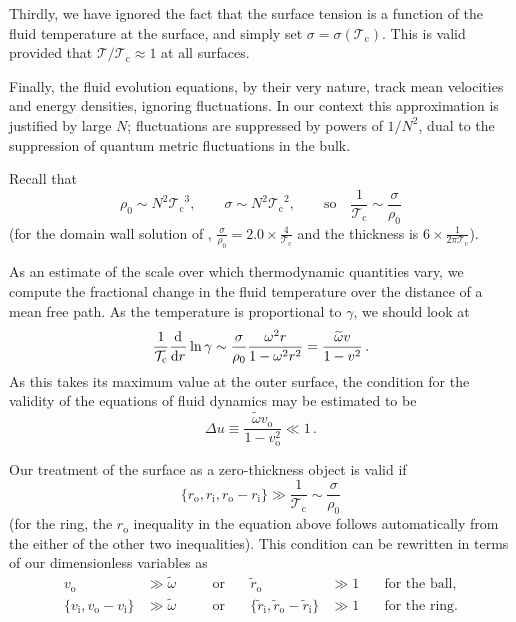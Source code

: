\documentclass[12pt,a4paper]{article}
\newcommand{\diff}[3][\rule{0mm}{0mm}]{\frac{\mathrm{d}^{#1} #2}{\mathrm{d}{#3}^{#1}}}
\newcommand{\rz}{\rho_0}
\newcommand{\tc}{\mathcal{T_\mathrm{c}}}
\newcommand{\tloc}{\mathcal{T}}
\newcommand{\ri}{r_\mathrm{i}}
\newcommand{\ro}{r_\mathrm{o}}
\newcommand{\vi}{v_\mathrm{i}}
\newcommand{\vo}{v_\mathrm{o}}
\newcommand{\z}{\tilde{r}}
\newcommand{\zi}{\z_\mathrm{i}}
\newcommand{\zo}{\z_\mathrm{o}}
\newcommand{\tw}{\widetilde{\omega}}
\begin{document}
Thirdly, we have ignored the fact that the surface tension is a
function of the fluid temperature at the surface, and simply set
$\sigma=\sigma(\tc)$. This is valid provided that $\tloc/\tc \approx
1$ at all surfaces.

Finally, the fluid evolution equations, by their very nature, track mean
velocities and energy densities, ignoring fluctuations. In our context this
approximation is justified by large $N$; fluctuations are suppressed by powers of $1/N^2$,
dual to the suppression of quantum metric fluctuations in the bulk.

Recall that
%
\begin{equation*}
  \rz \sim N^2\tc^3, \qquad \sigma \sim  N^2\tc^2,
  \qquad \text{so}\quad \frac{1}{\tc} \sim \frac{\sigma}{\rz}
\end{equation*}
%
(for the domain wall solution of \cite{Aharony:2005bm},
$\frac{\sigma}{\rz}=2.0\times \frac{4}{\tc}$ and the thickness is
$6\times \frac{1}{2\pi \tc}$).

As an estimate of the scale over which thermodynamic quantities
vary, we compute the fractional change in the fluid temperature over
the distance of a mean free path. As the temperature is proportional
to $\gamma$, we should look at
%
\begin{equation*}
  \frac{1}{\tc}\diff{}{r}\ln\gamma \sim
   \frac{\sigma}{\rz} \frac{\omega^2 r}{1-\omega^2r^2} =
   \frac{\tw v}{1-v^2}\,.
\end{equation*}
%
As this takes its maximum value at the outer surface, the condition
for the validity of the equations of fluid dynamics  may be
estimated to be
%
\begin{equation}\label{validity2:eq}
  \Delta u \equiv \frac{\tw \vo}{1-\vo^2} \ll 1\,.
\end{equation}
%

Our treatment of the surface as a zero-thickness object is valid if
%
\begin{equation*}
  \{\ro,\ri,\ro-\ri\} \gg \frac{1}{\tc} \sim
  \frac{\sigma}{\rz}
\end{equation*}
%
(for the ring, the $\ro$ inequality in the equation above follows
automatically from the either of the other two inequalities). This
condition can be rewritten in terms of our dimensionless variables
as
%
\begin{equation}\label{validity:eq}
\begin{aligned}
  \vo &\gg \tw
      &\quad&\text{or}\quad&
   \zo &\gg 1
      &\quad \text{for the ball,}\\
  \{\vi,\vo-\vi\} &\gg \tw
      &\quad&\text{or}\quad&
   \{\zi,\zo-\zi\} &\gg 1
      &\quad \text{for the ring.}
\end{aligned}
\end{equation}
%
\end{document}
